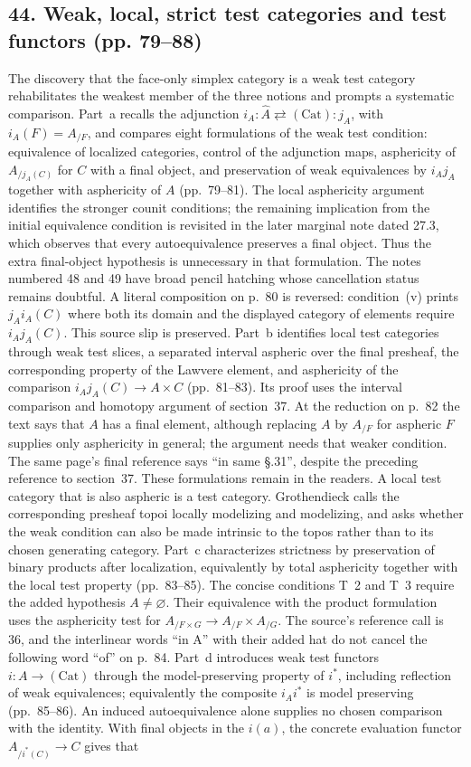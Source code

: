 \subsection*{44. Weak, local, strict test categories and test functors (pp. 79--88)}
The discovery that the face-only simplex category is a weak test category rehabilitates the weakest member of the three notions and prompts a systematic comparison. Part~a recalls the adjunction $i_A:\widehat A\rightleftarrows(\mathrm{Cat}):j_A$, with $i_A(F)=A_{/F}$, and compares eight formulations of the weak test condition: equivalence of localized categories, control of the adjunction maps, asphericity of $A_{/j_A(C)}$ for $C$ with a final object, and preservation of weak equivalences by $i_Aj_A$ together with asphericity of $A$ (pp.~79--81). The local asphericity argument identifies the stronger counit conditions; the remaining implication from the initial equivalence condition is revisited in the later marginal note dated 27.3, which observes that every autoequivalence preserves a final object. Thus the extra final-object hypothesis is unnecessary in that formulation. The notes numbered 48 and 49 have broad pencil hatching whose cancellation status remains doubtful. A literal composition on p.~80 is reversed: condition~(v) prints $j_Ai_A(C)$ where both its domain and the displayed category of elements require $i_Aj_A(C)$. This source slip is preserved. Part~b identifies local test categories through weak test slices, a separated interval aspheric over the final presheaf, the corresponding property of the Lawvere element, and asphericity of the comparison $i_Aj_A(C)\to A\times C$ (pp.~81--83). Its proof uses the interval comparison and homotopy argument of section~37. At the reduction on p.~82 the text says that $A$ has a final element, although replacing $A$ by $A_{/F}$ for aspheric $F$ supplies only asphericity in general; the argument needs that weaker condition. The same page's final reference says ``in same \S.31'', despite the preceding reference to section~37. These formulations remain in the readers. A local test category that is also aspheric is a test category. Grothendieck calls the corresponding presheaf topoi locally modelizing and modelizing, and asks whether the weak condition can also be made intrinsic to the topos rather than to its chosen generating category. Part~c characterizes strictness by preservation of binary products after localization, equivalently by total asphericity together with the local test property (pp.~83--85). The concise conditions T~2 and T~3 require the added hypothesis $A\ne\varnothing$. Their equivalence with the product formulation uses the asphericity test for $A_{/F\times G}\to A_{/F}\times A_{/G}$. The source's reference call is 36, and the interlinear words ``in A'' with their added hat do not cancel the following word ``of'' on p.~84. Part~d introduces weak test functors $i:A\to(\mathrm{Cat})$ through the model-preserving property of $i^*$, including reflection of weak equivalences; equivalently the composite $i_Ai^*$ is model preserving (pp.~85--86). An induced autoequivalence alone supplies no chosen comparison with the identity. With final objects in the $i(a)$, the concrete evaluation functor $A_{/i^*(C)}\to C$ gives that 